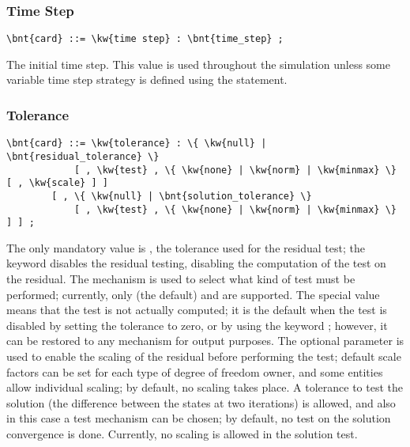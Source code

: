 \subsubsection{Time Step}
\begin{Verbatim}[commandchars=\\\{\}]
    \bnt{card} ::= \kw{time step} : \bnt{time_step} ;
\end{Verbatim}
The initial time step.
This value is used throughout the simulation unless some variable time step
strategy is defined using the  statement.

\subsubsection{Tolerance}\label{sec:IVP:TOLERANCE}
\begin{Verbatim}[commandchars=\\\{\}]
    \bnt{card} ::= \kw{tolerance} : \{ \kw{null} | \bnt{residual_tolerance} \}
            [ , \kw{test} , \{ \kw{none} | \kw{norm} | \kw{minmax} \} [ , \kw{scale} ] ]
        [ , \{ \kw{null} | \bnt{solution_tolerance} \} 
            [ , \kw{test} , \{ \kw{none} | \kw{norm} | \kw{minmax} \} ] ] ;
\end{Verbatim}
The only mandatory value is , 
the tolerance used for the residual test; the keyword 
disables the residual testing, disabling the computation
of the test on the residual.
The  mechanism is used to select what kind of test must
be performed; currently, only  (the default) 
and  are supported.
The special value  means that the test is not actually 
computed; it is the default when the test is disabled by setting
the tolerance to zero, or by using the keyword ;
however, it can be restored to any mechanism for output purposes.
The optional parameter  is used to enable the scaling
of the residual before performing the test; default scale factors 
can be set for each type of degree of freedom owner, and some
entities allow individual scaling; by default, no scaling takes place.
A tolerance  to test the solution 
(the difference between the states at two iterations) is allowed, 
and also in this case a test mechanism can be chosen;
by default, no test on the solution convergence is done.
Currently, no scaling is allowed in the solution test.

